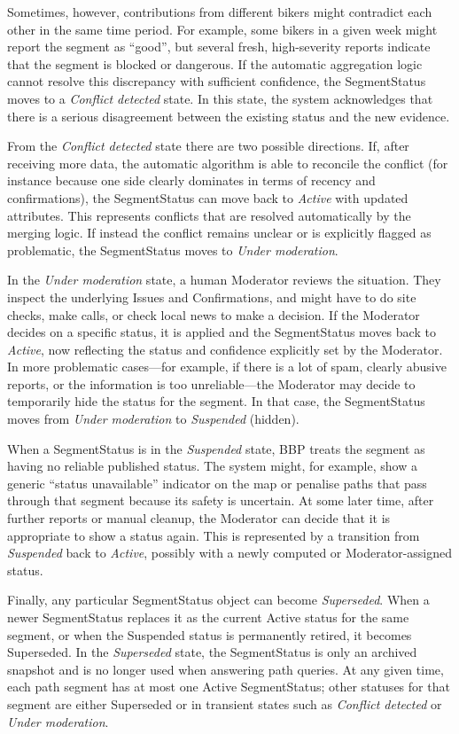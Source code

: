 Sometimes, however, contributions from different bikers might contradict each other in the same time period. For example, some bikers in a given week might report the segment as ``good'', but several fresh, high-severity reports indicate that the segment is blocked or dangerous. If the automatic aggregation logic cannot resolve this discrepancy with sufficient confidence, the SegmentStatus moves to a \textit{Conflict detected} state. In this state, the system acknowledges that there is a serious disagreement between the existing status and the new evidence.

From the \textit{Conflict detected} state there are two possible directions. If, after receiving more data, the automatic algorithm is able to reconcile the conflict (for instance because one side clearly dominates in terms of recency and confirmations), the SegmentStatus can move back to \textit{Active} with updated attributes. This represents conflicts that are resolved automatically by the merging logic. If instead the conflict remains unclear or is explicitly flagged as problematic, the SegmentStatus moves to \textit{Under moderation}.

In the \textit{Under moderation} state, a human Moderator reviews the situation. They inspect the underlying Issues and Confirmations, and might have to do site checks, make calls, or check local news to make a decision. If the Moderator decides on a specific status, it is applied and the SegmentStatus moves back to \textit{Active}, now reflecting the status and confidence explicitly set by the Moderator. In more problematic cases---for example, if there is a lot of spam, clearly abusive reports, or the information is too unreliable---the Moderator may decide to temporarily hide the status for the segment. In that case, the SegmentStatus moves from \textit{Under moderation} to \textit{Suspended} (hidden).

When a SegmentStatus is in the \textit{Suspended} state, BBP treats the segment as having no reliable published status. The system might, for example, show a generic ``status unavailable'' indicator on the map or penalise paths that pass through that segment because its safety is uncertain. At some later time, after further reports or manual cleanup, the Moderator can decide that it is appropriate to show a status again. This is represented by a transition from \textit{Suspended} back to \textit{Active}, possibly with a newly computed or Moderator-assigned status.

Finally, any particular SegmentStatus object can become \textit{Superseded}. When a newer SegmentStatus replaces it as the current Active status for the same segment, or when the Suspended status is permanently retired, it becomes Superseded. In the \textit{Superseded} state, the SegmentStatus is only an archived snapshot and is no longer used when answering path queries. At any given time, each path segment has at most one Active SegmentStatus; other statuses for that segment are either Superseded or in transient states such as \textit{Conflict detected} or \textit{Under moderation}.


